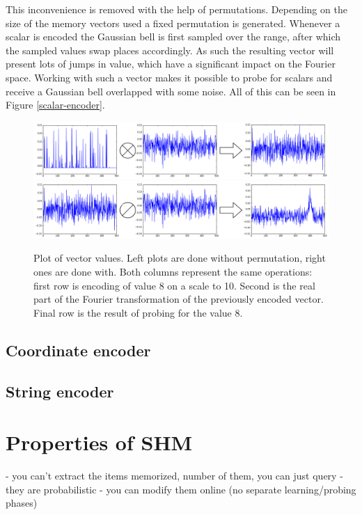 \documentclass[conference]{IEEEtran}
\begin{document}
This inconvenience is removed with the help of permutations. Depending on the size of the memory vectors used a fixed permutation is generated. Whenever a scalar is encoded the Gaussian bell is first sampled over the range, after which the sampled values swap places accordingly. As such the resulting vector will present lots of jumps in value, which have a significant impact on the Fourier space. Working with such a vector makes it possible to probe for scalars and receive a Gaussian bell overlapped with some noise. All of this can be seen in Figure \ref{scalar-encoder}.

\begin{figure}
\includegraphics[width=\columnwidth]{img/scalar-post-perm.png}
\includegraphics[width=\columnwidth]{img/scalar-post-perm-probe.png}
\caption{Plot of vector values. Left plots are done without permutation, right ones are done with. Both columns represent the same operations: first row is encoding of value 8 on a scale to 10. Second is the real part of the Fourier transformation of the previously encoded vector. Final row is the result of probing for the value 8.}
\label{no-perm}
\end{figure}



\subsection{Coordinate encoder}

\subsection{String encoder}

\section{Properties of SHM}

- you can't extract the items memorized, number of them, you can just query
- they are probabilistic
- you can modify them online (no separate learning/probing phases)
\end{document}
